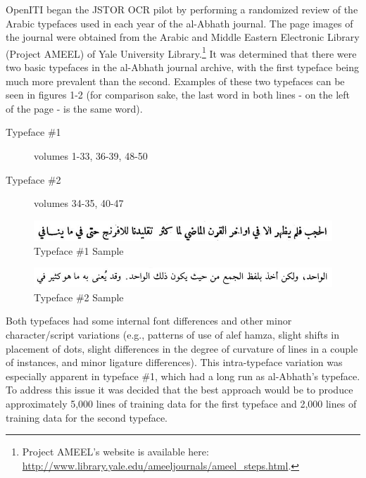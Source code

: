 OpenITI began the JSTOR OCR pilot by performing a randomized review of the
Arabic typefaces used in each year of the al-Abhath journal. The page images of
the journal were obtained from the Arabic and Middle Eastern Electronic Library
(Project AMEEL) of Yale University Library.\footnote{Project AMEEL’s website is
available here:
\url{http://www.library.yale.edu/ameeljournals/ameel_steps.html}.} It was
determined that there were two basic typefaces in the al-Abhath journal
archive, with the first typeface being much more prevalent than the second.
Examples of these two typefaces can be seen in figures 1-2 (for comparison
sake, the last word in both lines - on the left of the page - is the same
word).

\begin{description}
	\item[Typeface \#1] volumes 1-33, 36-39, 48-50
	\item[Typeface \#2] volumes 34-35, 40-47
\end{description}

\begin{figure}[h]
	\includegraphics[width=\linewidth]{images/image8.png}
	\caption{Typeface \#1 Sample}
	\label{fig3:fig1} 
\end{figure}

\begin{figure}[h]
	\includegraphics[width=\linewidth]{images/image9.png}
	\caption{Typeface \#2 Sample}
	\label{fig3:fig2} 
\end{figure}

Both typefaces had some internal font differences and other minor
character/script variations (e.g., patterns of use of alef hamza, slight shifts
in placement of dots, slight differences in the degree of curvature of lines in
a couple of instances, and minor ligature differences). This intra-typeface
variation was especially apparent in typeface \#1, which had a long run as
al-Abhath’s typeface. To address this issue it was decided that the best
approach would be to produce approximately 5,000 lines of training data for the
first typeface and 2,000 lines of training data for the second typeface. 

